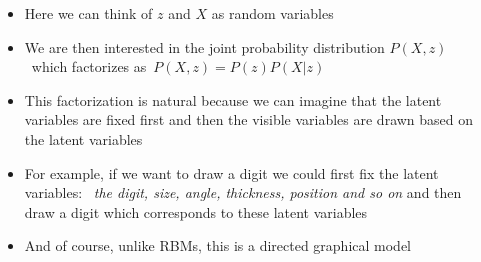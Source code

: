 \begin{frame}
\end{frame}


\begin{frame}
	\begin{columns}
		\begin{overlayarea}{\textwidth}{\textheight}
			\vspace{3pt}
			

		\end{overlayarea}
		\begin{overlayarea}{\textwidth}{\textheight}
			\begin{itemize}[<+->]\justifying
				\item Here we can think of $z$ and $X$ as random variables
				\item We are then interested in the joint probability distribution $P(X,z)$ which factorizes as $P(X,z) = P(z)P(X|z)$
				\item This factorization is natural because we can imagine that the latent variables are fixed first and then the visible variables are drawn based on the latent variables
				\item For example, if we want to draw a digit we could first fix the latent variables:  \textit{the digit, size, angle, thickness, position and so on} and then draw a digit which corresponds to these latent variables
				\item And of course, unlike RBMs, this is a directed graphical model
			\end{itemize}
		\end{overlayarea}
	\end{columns}
\end{frame}


